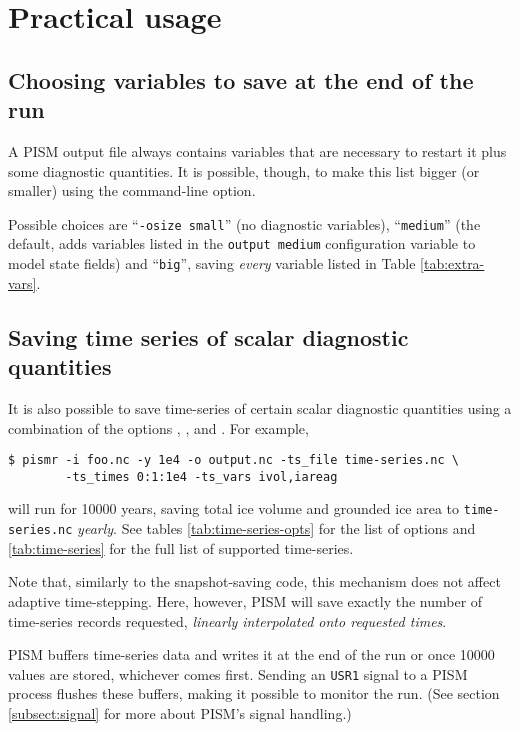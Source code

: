 
\section{Practical usage}
\label{sec:practical-usage}

\subsection{Choosing variables to save at the end of the run}
\label{sec:output-size}

A PISM output file always contains variables that are necessary to restart it
plus some diagnostic quantities. It is possible, though, to make this list
bigger (or smaller) using the  command-line option.

Possible choices are ``\texttt{-o\und size small}'' (no diagnostic variables),
``\texttt{medium}'' (the default, adds variables listed in the \texttt{output\und
  medium} configuration variable to model state fields) and ``\texttt{big}'',
saving \emph{every} variable listed in Table \ref{tab:extra-vars}.

\subsection{Saving time series of scalar diagnostic quantities}
\label{sec:saving-time-series}
 It is also possible to save time-series of certain scalar diagnostic quantities using a combination of the options , , and .  For example,
\begin{verbatim}
$ pismr -i foo.nc -y 1e4 -o output.nc -ts_file time-series.nc \
        -ts_times 0:1:1e4 -ts_vars ivol,iareag
\end{verbatim} %
will run for 10000 years, saving total ice volume and grounded ice area to \texttt{time-series.nc} \emph{yearly}. See tables \ref{tab:time-series-opts} for the list of options and \ref{tab:time-series} for the full list of supported time-series.

Note that, similarly to the snapshot-saving code, this mechanism does not affect adaptive time-stepping.  Here, however, PISM will save exactly the number of time-series records requested, \emph{linearly interpolated onto requested times}.

PISM buffers time-series data and writes it at the end of the run or once 10000 values are stored, whichever comes first. Sending an \texttt{USR1} signal to a PISM process flushes these buffers, making it possible to monitor the run. (See section \ref{subsect:signal} for more about PISM's signal handling.)

